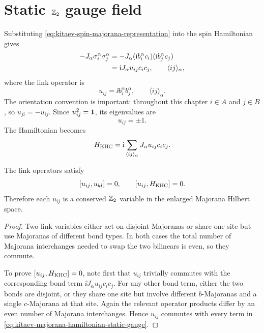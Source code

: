 \section{Static \texorpdfstring{\(\mathbb{Z}_2\)}{Z2} gauge field}
\label{sec:kitaev-static-z2-gauge-field}

Substituting \cref{eq:kitaev-spin-majorana-representation} into the spin
Hamiltonian gives
\begin{align}
\label{eq:kitaev-majorana-hamiltonian-derivation}
    -J_\alpha\sigma_i^\alpha\sigma_j^\alpha
    &=-J_\alpha(\mathrm{i} b_i^\alpha c_i)(\mathrm{i} b_j^\alpha c_j)  \notag\\
    &=\mathrm{i} J_\alpha u_{ij} c_i c_j,
    \qquad
    \langle ij\rangle_\alpha,
\end{align}
where the link operator is
\begin{equation}
\label{eq:kitaev-link-variable}
    u_{ij}=\ii b_i^\alpha b_j^\alpha,
    \qquad
    \langle ij\rangle_\alpha .
\end{equation}
The orientation convention is important: throughout this chapter \(i\in A\) and
\(j\in B\), so \(u_{ji}=-u_{ij}\).  Since \(u_{ij}^2=\mathbf{1}\), its eigenvalues are
\begin{equation}
\label{eq:kitaev-link-eigenvalues}
    u_{ij}=\pm1 .
\end{equation}
The Hamiltonian becomes
\begin{equation}
\label{eq:kitaev-majorana-hamiltonian-static-gauge}
    H_{\rm KHC}
    =
    \mathrm{i}\sum_{\langle ij\rangle_\alpha}J_\alpha u_{ij}c_i c_j .
\end{equation}

\begin{proposition}
The link operators satisfy
\begin{equation}
\label{eq:kitaev-u-commutation}
    [u_{ij},u_{kl}]=0,
    \qquad
    [u_{ij},H_{\rm KHC}]=0 .
\end{equation}
Therefore each \(u_{ij}\) is a conserved \(\mathbb{Z}_2\) variable in the enlarged
Majorana Hilbert space.
\end{proposition}

\begin{proof}
Two link variables either act on disjoint Majoranas or share one site but use
Majoranas of different bond types.  In both cases the total number of Majorana
interchanges needed to swap the two bilinears is even, so they commute.

To prove \([u_{ij},H_{\rm KHC}]=0\), note first that \(u_{ij}\) trivially
commutes with the corresponding bond term
\(\ii J_\alpha u_{ij}c_i c_j\).  For any other bond term, either the two bonds
are disjoint, or they share one site but involve different \(b\)-Majoranas and a
single \(c\)-Majorana at that site.  Again the relevant operator products differ
by an even number of Majorana interchanges.  Hence \(u_{ij}\) commutes with
every term in \cref{eq:kitaev-majorana-hamiltonian-static-gauge}.
\end{proof}

